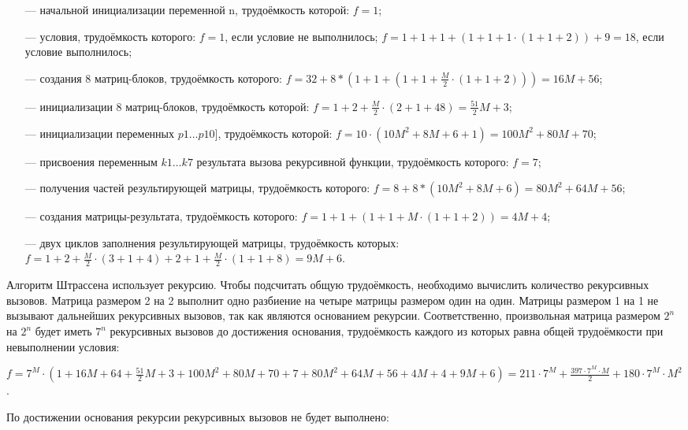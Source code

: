 \begin{itemize}
	\item[---] начальной инициализации переменной n, трудоёмкость которой: $f = 1$;
	\item[---] условия, трудоёмкость которого: $f = 1$, если условие не выполнилось; $f = 1 + 1 + 1 + (1 + 1 + 1 \cdot (1 + 1 + 2)) + 9 = 18$, если условие выполнилось;
	\item[---] создания 8 матриц-блоков, трудоёмкость которого: $f = 32 + 8 * (1 + 1 + (1 + 1 + \frac{M}{2} \cdot (1 + 1 + 2))) = 16M+56$;
	\item[---] инициализации 8 матриц-блоков, трудоёмкость которой: $f = 1 + 2 + \frac{M}{2} \cdot (2 + 1 + 48) = \frac{51}{2}M + 3$;  
	\item[---] инициализации переменных $p1 \ldots p10]$, трудоёмкость которой: $f = 10 \cdot (10M^2 + 8M + 6 + 1) = 100M^2 + 80M + 70$;
	\item[---] присвоения переменным $k1 \ldots k7$ результата вызова рекурсивной функции, трудоёмкость которого: $f = 7$;
	\item[---] получения частей результирующей матрицы, трудоёмкость которого: $f = 8 + 8 * (10M^2 + 8M + 6) = 80M^2 + 64M + 56$;
	\item[---] создания матрицы-результата, трудоёмкость которого: $f = 1 + 1 + (1 + 1 + M \cdot (1 + 1 + 2)) = 4M+4$;
	\item[---] двух циклов заполнения результирующей матрицы, трудоёмкость которых: $f = 1 + 2 + \frac{M}{2} \cdot (3 + 1 + 4) + 2 + 1 + \frac{M}{2} \cdot (1 + 1 + 8) = 9M + 6$.
	
\end{itemize}

Алгоритм Штрассена использует рекурсию. Чтобы подсчитать общую трудоёмкость, необходимо вычислить количество рекурсивных вызовов. Матрица размером 2 на 2 выполнит одно разбиение на четыре матрицы размером один на один. Матрицы размером 1 на 1 не вызывают дальнейших рекурсивных вызовов, так как являются основанием рекурсии. Соответственно, произвольная матрица размером $2^n$ на $2^n$ будет иметь $7^n$ рекурсивных вызовов до достижения основания, трудоёмкость каждого из которых равна общей трудоёмкости при невыполнении условия:

$f = 7^M \cdot (1 + 16M+64 + \frac{51}{2}M + 3 + 100M^2 + 80M + 70 + 7 + 80M^2 + 64M + 56 + 4M+4 + 9M+6) = 211 \cdot 7^M + \frac{397 \cdot 7^M \cdot M}{2} + 180 \cdot 7^M \cdot M^2$.

По достижении основания рекурсии рекурсивных вызовов не будет выполнено:

